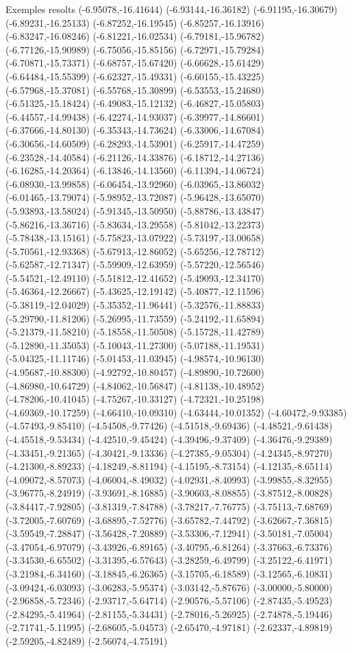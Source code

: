 \documentclass[11pt,a4paper]{article}
\begin{document}
\begin{fmex}{Exemples resolts}
(-6.95078,-16.41644) (-6.93144,-16.36182) (-6.91195,-16.30679) (-6.89231,-16.25133) (-6.87252,-16.19545) (-6.85257,-16.13916) (-6.83247,-16.08246) (-6.81221,-16.02534) (-6.79181,-15.96782) (-6.77126,-15.90989) (-6.75056,-15.85156) (-6.72971,-15.79284) (-6.70871,-15.73371) (-6.68757,-15.67420) (-6.66628,-15.61429) (-6.64484,-15.55399) (-6.62327,-15.49331) (-6.60155,-15.43225) (-6.57968,-15.37081) (-6.55768,-15.30899) (-6.53553,-15.24680) (-6.51325,-15.18424) (-6.49083,-15.12132) (-6.46827,-15.05803) (-6.44557,-14.99438) (-6.42274,-14.93037) (-6.39977,-14.86601) (-6.37666,-14.80130) (-6.35343,-14.73624) (-6.33006,-14.67084) (-6.30656,-14.60509) (-6.28293,-14.53901) (-6.25917,-14.47259) (-6.23528,-14.40584) (-6.21126,-14.33876) (-6.18712,-14.27136) (-6.16285,-14.20364) (-6.13846,-14.13560) (-6.11394,-14.06724) (-6.08930,-13.99858) (-6.06454,-13.92960) (-6.03965,-13.86032) (-6.01465,-13.79074) (-5.98952,-13.72087) (-5.96428,-13.65070) (-5.93893,-13.58024) (-5.91345,-13.50950) (-5.88786,-13.43847) (-5.86216,-13.36716) (-5.83634,-13.29558) (-5.81042,-13.22373) (-5.78438,-13.15161) (-5.75823,-13.07922) (-5.73197,-13.00658) (-5.70561,-12.93368) (-5.67913,-12.86052) (-5.65256,-12.78712) (-5.62587,-12.71347) (-5.59909,-12.63959) (-5.57220,-12.56546) (-5.54521,-12.49110) (-5.51812,-12.41652) (-5.49093,-12.34170) (-5.46364,-12.26667) (-5.43625,-12.19142) (-5.40877,-12.11596) (-5.38119,-12.04029) (-5.35352,-11.96441) (-5.32576,-11.88833) (-5.29790,-11.81206) (-5.26995,-11.73559) (-5.24192,-11.65894) (-5.21379,-11.58210) (-5.18558,-11.50508) (-5.15728,-11.42789) (-5.12890,-11.35053) (-5.10043,-11.27300) (-5.07188,-11.19531) (-5.04325,-11.11746) (-5.01453,-11.03945) (-4.98574,-10.96130) (-4.95687,-10.88300) (-4.92792,-10.80457) (-4.89890,-10.72600) (-4.86980,-10.64729) (-4.84062,-10.56847) (-4.81138,-10.48952) (-4.78206,-10.41045) (-4.75267,-10.33127) (-4.72321,-10.25198) (-4.69369,-10.17259) (-4.66410,-10.09310) (-4.63444,-10.01352) (-4.60472,-9.93385) (-4.57493,-9.85410) (-4.54508,-9.77426) (-4.51518,-9.69436) (-4.48521,-9.61438) (-4.45518,-9.53434) (-4.42510,-9.45424) (-4.39496,-9.37409) (-4.36476,-9.29389) (-4.33451,-9.21365) (-4.30421,-9.13336) (-4.27385,-9.05304) (-4.24345,-8.97270) (-4.21300,-8.89233) (-4.18249,-8.81194) (-4.15195,-8.73154) (-4.12135,-8.65114) (-4.09072,-8.57073) (-4.06004,-8.49032) (-4.02931,-8.40993) (-3.99855,-8.32955) (-3.96775,-8.24919) (-3.93691,-8.16885) (-3.90603,-8.08855) (-3.87512,-8.00828) (-3.84417,-7.92805) (-3.81319,-7.84788) (-3.78217,-7.76775) (-3.75113,-7.68769) (-3.72005,-7.60769) (-3.68895,-7.52776) (-3.65782,-7.44792) (-3.62667,-7.36815) (-3.59549,-7.28847) (-3.56428,-7.20889) (-3.53306,-7.12941) (-3.50181,-7.05004) (-3.47054,-6.97079) (-3.43926,-6.89165) (-3.40795,-6.81264) (-3.37663,-6.73376) (-3.34530,-6.65502) (-3.31395,-6.57643) (-3.28259,-6.49799) (-3.25122,-6.41971) (-3.21984,-6.34160) (-3.18845,-6.26365) (-3.15705,-6.18589) (-3.12565,-6.10831) (-3.09424,-6.03093) (-3.06283,-5.95374) (-3.03142,-5.87676) (-3.00000,-5.80000) (-2.96858,-5.72346) (-2.93717,-5.64714) (-2.90576,-5.57106) (-2.87435,-5.49523) (-2.84295,-5.41964) (-2.81155,-5.34431) (-2.78016,-5.26925) (-2.74878,-5.19446) (-2.71741,-5.11995) (-2.68605,-5.04573) (-2.65470,-4.97181) (-2.62337,-4.89819) (-2.59205,-4.82489) (-2.56074,-4.75191) 
\end{fmex}
\end{document}
